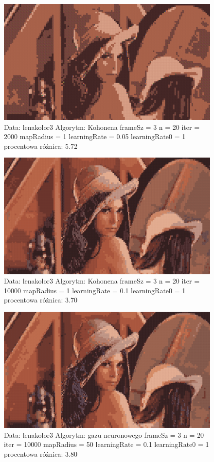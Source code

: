 \documentclass{classrep}
\begin{document}
{{\newpage

\begin{figure}[h!]
 \centering
 \includegraphics[width=12cm]{img/khn1.png}
 \vspace{-0.3cm}
 \caption{Data: lenakolor3 Algorytm: Kohonena frameSz = 3 n = 20 iter = 2000 mapRadius = 1 learningRate = 0.05 learningRate0  = 1 procentowa różnica: 5.72
}
\end{figure}

\begin{figure}[h!]
 \centering
 \includegraphics[width=12cm]{img/kohonen_4.png}
 \vspace{-0.3cm}
 \caption{Data: lenakolor3 Algorytm: Kohonena frameSz = 3 n = 20 iter = 10000 mapRadius = 1 learningRate = 0.1 learningRate0  = 1 procentowa różnica: 3.70
}
\end{figure}

\newpage

\begin{figure}[h!]
 \centering
 \includegraphics[width=12cm]{img/ng2.png}
 \vspace{-0.3cm}
 \caption{Data: lenakolor3 Algorytm: gazu neuronowego frameSz = 3 n = 20 iter = 10000 mapRadius = 50 learningRate = 0.1 learningRate0  = 1 procentowa różnica: 3.80
}
\end{figure}

}}
\end{document}
